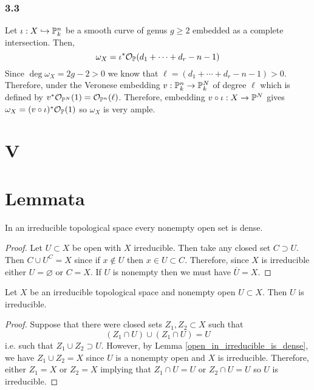 \documentclass[12pt]{article}
\begin{document}
\subsubsection{3.3}

Let $\iota : X \embed \P^n_k$ be a smooth curve of genus $g \ge 2$ embedded as a complete intersection. Then,
\[ \omega_X = \iota^* \struct{\P}(d_1 + \cdots + d_r - n - 1) \]
Since $\deg{\omega_X} = 2 g - 2 > 0$ we know that $\ell = (d_1 + \cdots + d_r - n - 1) > 0$. Therefore, under the Veronese embedding $v : \P^n_k \to \P^N_k$ of degree $\ell$ which is defined by $v^* \struct{\P^{N}}(1) = \struct{\P^n}(\ell)$. Therefore, embedding $v \circ \iota : X \to \P^N$ gives $\omega_X = (v \circ \iota)^* \struct{\P}(1)$ so $\omega_X$ is very ample. 



\section{V}

\section{Lemmata}


\begin{lemma} \label{open_in_irreducible_is_dense}
In an irreducible topological space every nonempty open set is dense.
\end{lemma}

\begin{proof}
Let $U \subset X$ be open with $X$ irreducible. Then take any closed set $C \supset U$. Then $C \cup U^C = X$ since if $x \notin U$ then $x \in U \subset C$. Therefore, since $X$ is irreducible either $U = \varnothing$ or $C = X$. If $U$ is nonempty then we must have $\overline{U} = X$.  
\end{proof}

\begin{lemma} \label{open_of_irreducible}
Let $X$ be an irreducible topological space and nonempty open $U \subset X$. Then $U$ is irreducible.
\end{lemma}

\begin{proof}
Suppose that there were closed sets $Z_1, Z_2 \subset X$ such that
 \[ (Z_1 \cap U) \cup (Z_1 \cap U) = U \]
 i.e. such that $Z_1 \cup Z_2 \supset U$. However, by Lemma \ref{open_in_irreducible_is_dense}, we have $Z_1 \cup Z_2 = X$ since $U$ is a nonempty open and $X$ is irreducible. Therefore, either $Z_1 = X$ or $Z_2 = X$ implying that $Z_1 \cap U = U$ or $Z_2 \cap U = U$ so $U$ is irreducible.   
\end{proof}
\end{document}
